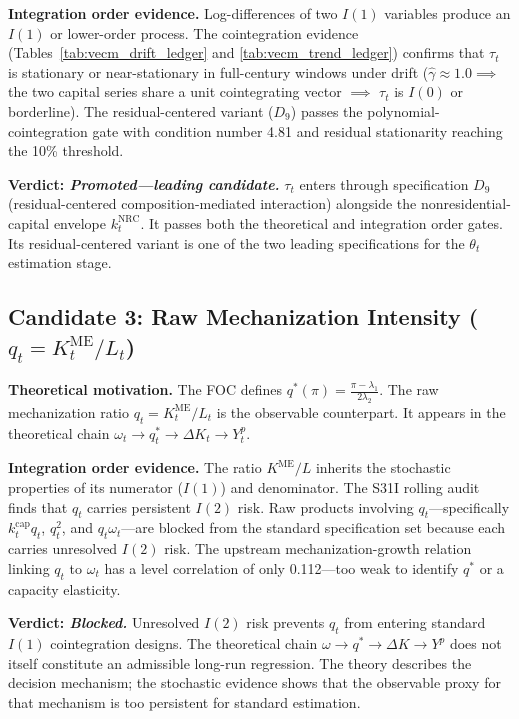 \documentclass[11pt,a4paper]{article}
\begin{document}
\textbf{Integration order evidence.} Log-differences of two $I(1)$ variables produce an $I(1)$ or lower-order process. The cointegration evidence (Tables~\ref{tab:vecm_drift_ledger} and \ref{tab:vecm_trend_ledger}) confirms that $\tau_t$ is stationary or near-stationary in full-century windows under drift ($\hat{\gamma} \approx 1.0 \implies$ the two capital series share a unit cointegrating vector $\implies$ $\tau_t$ is $I(0)$ or borderline). The residual-centered variant ($D_9$) passes the polynomial-cointegration gate with condition number 4.81 and residual stationarity reaching the 10\% threshold.

\textbf{Verdict: \textit{Promoted---leading candidate.}} $\tau_t$ enters through specification $D_9$ (residual-centered composition-mediated interaction) alongside the nonresidential-capital envelope $k_t^{\text{NRC}}$. It passes both the theoretical and integration order gates. Its residual-centered variant is one of the two leading specifications for the $\theta_t$ estimation stage.

\subsection{Candidate 3: Raw Mechanization Intensity ($q_t = K^{\text{ME}}_t / L_t$)}

\textbf{Theoretical motivation.} The FOC defines $q^*(\pi) = \frac{\pi - \lambda_1}{2\lambda_2}$. The raw mechanization ratio $q_t = K^{\text{ME}}_t / L_t$ is the observable counterpart. It appears in the theoretical chain $\omega_t \to q_t^* \to \Delta K_t \to Y_t^p$.

\textbf{Integration order evidence.} The ratio $K^{\text{ME}}/L$ inherits the stochastic properties of its numerator ($I(1)$) and denominator. The S31I rolling audit finds that $q_t$ carries persistent $I(2)$ risk. Raw products involving $q_t$---specifically $k_t^{\text{cap}} q_t$, $q_t^2$, and $q_t \omega_t$---are blocked from the standard specification set because each carries unresolved $I(2)$ risk. The upstream mechanization-growth relation linking $q_t$ to $\omega_t$ has a level correlation of only 0.112---too weak to identify $q^*$ or a capacity elasticity.

\textbf{Verdict: \textit{Blocked.}} Unresolved $I(2)$ risk prevents $q_t$ from entering standard $I(1)$ cointegration designs. The theoretical chain $\omega \to q^* \to \Delta K \to Y^p$ does not itself constitute an admissible long-run regression. The theory describes the decision mechanism; the stochastic evidence shows that the observable proxy for that mechanism is too persistent for standard estimation.
\end{document}
